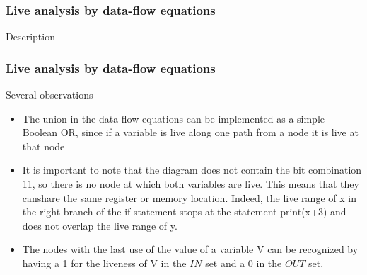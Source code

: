 \documentclass[presentation]{beamer}
\begin{document}
\begin{frame}
  \frametitle{Live analysis by data-flow equations}
  \begin{block}{Description}
  \end{block}
\end{frame}

\begin{frame}
  \frametitle{Live analysis by data-flow equations}
  \begin{block}{Several observations}
\begin{itemize}
    \item The union in the data-flow equations can be implemented as a simple Boolean OR, since if a variable is live along one path from a node it is live at that node
    \item  It is important to note that the diagram does not contain the bit combination 11, so there is no node at which both variables are live. This means that they canshare the same register or memory location. Indeed, the live range of x in the right branch of the if-statement stops at the statement print(x+3) and does not overlap the live range of y.
    \item  The nodes with the last use of the value of a variable V can be recognized by having a 1 for the liveness of V in the $IN$ set and a 0 in the $OUT$ set.
\end{itemize}
  \end{block}
\end{frame}
\end{document}

